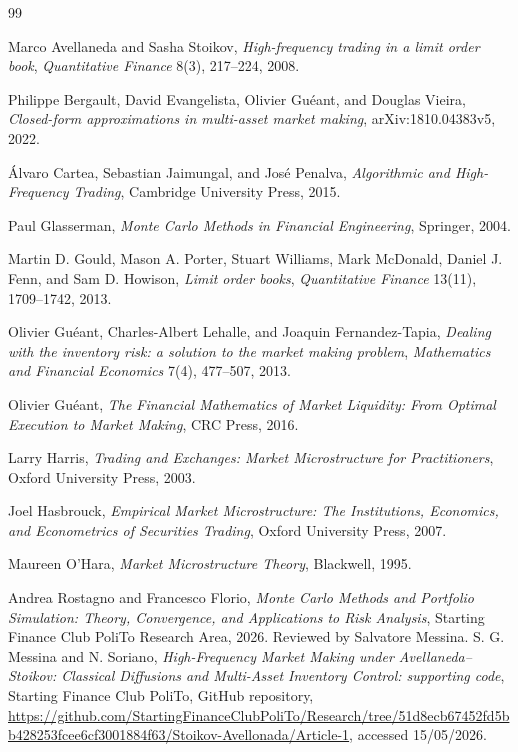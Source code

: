 \documentclass[a4paper,10pt,titlepage,oneside,openany]{book}
\theoremstyle{plain}\newtheorem{theorem}{Theorem}[chapter]
\theoremstyle{definition}\newtheorem{definition}{Definition}[chapter]
\theoremstyle{remark}\newtheorem{remark}{Remark}[chapter]
\newenvironment{references}{\begin{thebibliography}{99}}{\end{thebibliography}}
\begin{document}
\begin{references}

Marco Avellaneda and Sasha Stoikov,
\emph{High-frequency trading in a limit order book},
\emph{Quantitative Finance} 8(3), 217--224, 2008.

Philippe Bergault, David Evangelista, Olivier Gu\'eant, and Douglas Vieira,
\emph{Closed-form approximations in multi-asset market making},
arXiv:1810.04383v5, 2022.

\'Alvaro Cartea, Sebastian Jaimungal, and Jos\'e Penalva,
\emph{Algorithmic and High-Frequency Trading},
Cambridge University Press, 2015.

Paul Glasserman,
\emph{Monte Carlo Methods in Financial Engineering},
Springer, 2004.

Martin D. Gould, Mason A. Porter, Stuart Williams, Mark McDonald, Daniel J. Fenn, and Sam D. Howison,
\emph{Limit order books},
\emph{Quantitative Finance} 13(11), 1709--1742, 2013.

Olivier Gu\'eant, Charles-Albert Lehalle, and Joaquin Fernandez-Tapia,
\emph{Dealing with the inventory risk: a solution to the market making problem},
\emph{Mathematics and Financial Economics} 7(4), 477--507, 2013.

Olivier Gu\'eant,
\emph{The Financial Mathematics of Market Liquidity: From Optimal Execution to Market Making},
CRC Press, 2016.

Larry Harris,
\emph{Trading and Exchanges: Market Microstructure for Practitioners},
Oxford University Press, 2003.

Joel Hasbrouck,
\emph{Empirical Market Microstructure: The Institutions, Economics, and Econometrics of Securities Trading},
Oxford University Press, 2007.

Maureen O'Hara,
\emph{Market Microstructure Theory},
Blackwell, 1995.

Andrea Rostagno and Francesco Florio,
\emph{Monte Carlo Methods and Portfolio Simulation: Theory, Convergence, and Applications to Risk Analysis},
Starting Finance Club PoliTo Research Area, 2026.
Reviewed by Salvatore Messina.
S. G. Messina and N. Soriano,
\emph{High-Frequency Market Making under Avellaneda--Stoikov: Classical Diffusions and Multi-Asset Inventory Control: supporting code},
Starting Finance Club PoliTo, GitHub repository,
\url{https://github.com/StartingFinanceClubPoliTo/Research/tree/51d8ecb67452fd5bb428253fcee6cf3001884f63/Stoikov-Avellonada/Article-1},
accessed 15/05/2026.
\end{references}
\end{document}
